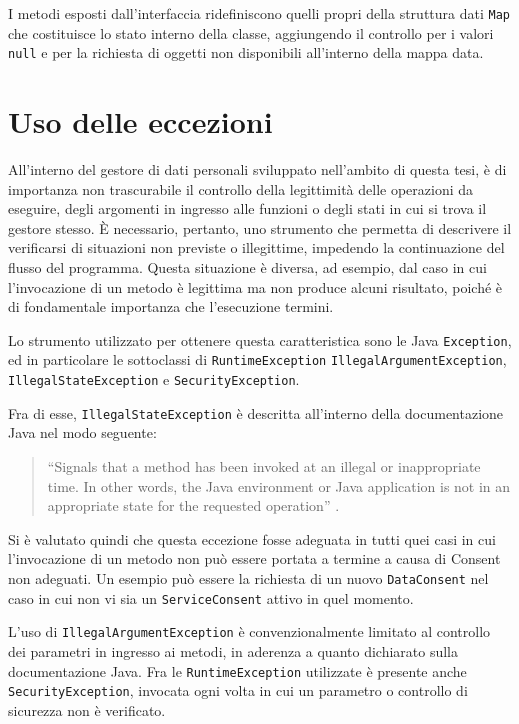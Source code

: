 I metodi esposti dall’interfaccia ridefiniscono quelli propri della struttura dati \texttt{Map} che costituisce lo stato interno della classe, aggiungendo il controllo per i valori \texttt{null} e per la richiesta di oggetti non disponibili all’interno della mappa data.

\section{Uso delle eccezioni}
All’interno del gestore di dati personali sviluppato nell’ambito di questa tesi, \`e di importanza non trascurabile il controllo della legittimit\`a delle operazioni da eseguire, degli argomenti in ingresso alle funzioni o degli stati in cui si trova il gestore stesso. \`E necessario, pertanto, uno strumento che permetta di descrivere il verificarsi di situazioni non previste o illegittime, impedendo la continuazione del flusso del programma. Questa situazione \`e diversa, ad esempio, dal caso in cui l’invocazione di un metodo \`e legittima ma non produce alcuni risultato, poich\'e \`e di fondamentale importanza che l’esecuzione termini.

Lo strumento utilizzato per ottenere questa caratteristica sono le Java \texttt{Exception}, ed in particolare le sottoclassi di \texttt{RuntimeException} \texttt{IllegalArgumentException}, \texttt{IllegalStateException} e \texttt{SecurityException}. 

Fra di esse, \texttt{IllegalStateException} \`e descritta all’interno della documentazione Java nel modo seguente:
\begin{quote}
“Signals that a method has been invoked at an illegal or inappropriate time. In other words, the Java environment or Java application is not in an appropriate state for the requested operation” \cite{java8api}.
\end{quote}
Si \`e valutato quindi che questa eccezione fosse adeguata in tutti quei casi in cui l’invocazione di un metodo non pu\`o essere portata a termine a causa di Consent non adeguati. Un esempio pu\`o essere la richiesta di un nuovo \texttt{DataConsent} nel caso in cui non vi sia un \texttt{ServiceConsent} attivo in quel momento.

L’uso di \texttt{IllegalArgumentException} \`e convenzionalmente limitato al controllo dei parametri in ingresso ai metodi, in aderenza a quanto dichiarato sulla documentazione Java. Fra le \texttt{RuntimeException} utilizzate \`e presente anche \texttt{SecurityException}, invocata ogni volta in cui un parametro o controllo di sicurezza non \`e verificato.

